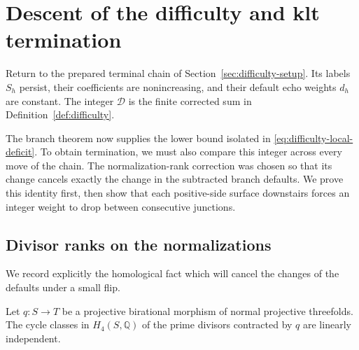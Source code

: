 \section{Descent of the difficulty and klt termination}
\label{sec:difficulty}

Return to the prepared terminal chain of
Section~\ref{sec:difficulty-setup}.  Its labels $S_h$ persist, their
coefficients are nonincreasing, and their default echo weights $d_h$
are constant.  The integer $\mathcal D$ is the finite corrected sum
in Definition~\ref{def:difficulty}.

The branch theorem now supplies the lower bound isolated in
\eqref{eq:difficulty-local-deficit}.  To obtain termination, we must
also compare this integer across every move of the chain.  The
normalization-rank correction was chosen so that its change cancels
exactly the change in the subtracted branch defaults.  We prove this
identity first, then show that each positive-side surface downstairs
forces an integer weight to drop between consecutive junctions.

\subsection{Divisor ranks on the normalizations}

We record explicitly the homological fact which will cancel the
changes of the defaults under a small flip.

\begin{lemma}
\label{difficulty:normalization-independence}
Let \(q:S\to T\) be a projective birational morphism of normal
projective threefolds.  The cycle classes in \(H_4(S,\mathbb Q)\)
of the prime divisors contracted by \(q\) are linearly independent.
\end{lemma}

